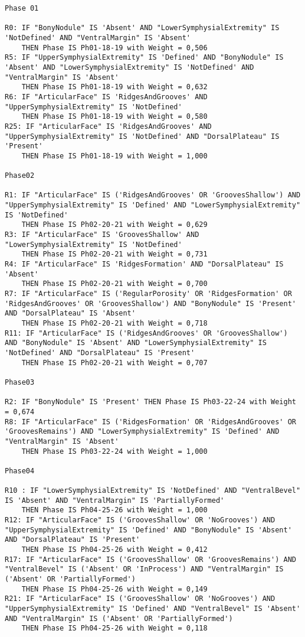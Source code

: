\begin{lstlisting}
Phase 01

R0: IF "BonyNodule" IS 'Absent' AND "LowerSymphysialExtremity" IS 'NotDefined' AND "VentralMargin" IS 'Absent'
	THEN Phase IS Ph01-18-19 with Weight = 0,506
R5: IF "UpperSymphysialExtremity" IS 'Defined' AND "BonyNodule" IS 'Absent' AND "LowerSymphysialExtremity" IS 'NotDefined' AND "VentralMargin" IS 'Absent'
	THEN Phase IS Ph01-18-19 with Weight = 0,632
R6: IF "ArticularFace" IS 'RidgesAndGrooves' AND "UpperSymphysialExtremity" IS 'NotDefined'
	THEN Phase IS Ph01-18-19 with Weight = 0,580
R25: IF "ArticularFace" IS 'RidgesAndGrooves' AND "UpperSymphysialExtremity" IS 'NotDefined' AND "DorsalPlateau" IS 'Present'
	THEN Phase IS Ph01-18-19 with Weight = 1,000

Phase02

R1: IF "ArticularFace" IS ('RidgesAndGrooves' OR 'GroovesShallow') AND "UpperSymphysialExtremity" IS 'Defined' AND "LowerSymphysialExtremity" IS 'NotDefined'
	THEN Phase IS Ph02-20-21 with Weight = 0,629
R3: IF "ArticularFace" IS 'GroovesShallow' AND "LowerSymphysialExtremity" IS 'NotDefined'
	THEN Phase IS Ph02-20-21 with Weight = 0,731
R4: IF "ArticularFace" IS 'RidgesFormation' AND "DorsalPlateau" IS 'Absent'
	THEN Phase IS Ph02-20-21 with Weight = 0,700
R7: IF "ArticularFace" IS ('RegularPorosity' OR 'RidgesFormation' OR 'RidgesAndGrooves' OR 'GroovesShallow') AND "BonyNodule" IS 'Present' AND "DorsalPlateau" IS 'Absent'
	THEN Phase IS Ph02-20-21 with Weight = 0,718
R11: IF "ArticularFace" IS ('RidgesAndGrooves' OR 'GroovesShallow') AND "BonyNodule" IS 'Absent' AND "LowerSymphysialExtremity" IS 'NotDefined' AND "DorsalPlateau" IS 'Present'
	THEN Phase IS Ph02-20-21 with Weight = 0,707

Phase03

R2: IF "BonyNodule" IS 'Present' THEN Phase IS Ph03-22-24 with Weight = 0,674
R8: IF "ArticularFace" IS ('RidgesFormation' OR 'RidgesAndGrooves' OR 'GroovesRemains') AND "LowerSymphysialExtremity" IS 'Defined' AND "VentralMargin" IS 'Absent'
	THEN Phase IS Ph03-22-24 with Weight = 1,000

Phase04

R10 : IF "LowerSymphysialExtremity" IS 'NotDefined' AND "VentralBevel" IS 'Absent' AND "VentralMargin" IS 'PartiallyFormed'
	THEN Phase IS Ph04-25-26 with Weight = 1,000
R12: IF "ArticularFace" IS ('GroovesShallow' OR 'NoGrooves') AND "UpperSymphysialExtremity" IS 'Defined' AND "BonyNodule" IS 'Absent' AND "DorsalPlateau" IS 'Present'
	THEN Phase IS Ph04-25-26 with Weight = 0,412
R17: IF "ArticularFace" IS ('GroovesShallow' OR 'GroovesRemains') AND "VentralBevel" IS ('Absent' OR 'InProcess') AND "VentralMargin" IS ('Absent' OR 'PartiallyFormed')
	THEN Phase IS Ph04-25-26 with Weight = 0,149
R21: IF "ArticularFace" IS ('GroovesShallow' OR 'NoGrooves') AND "UpperSymphysialExtremity" IS 'Defined' AND "VentralBevel" IS 'Absent' AND "VentralMargin" IS ('Absent' OR 'PartiallyFormed')
	THEN Phase IS Ph04-25-26 with Weight = 0,118


\end{lstlisting}
